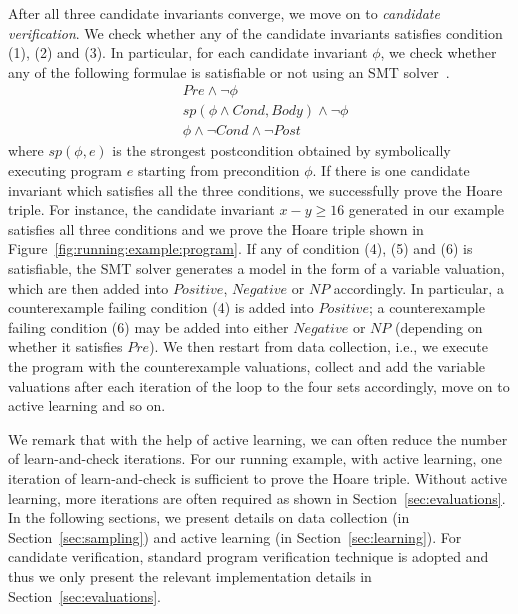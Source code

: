 After all three candidate invariants converge, we move on to \emph{candidate verification}. We check whether any of the candidate invariants satisfies condition (1), (2) and (3). In particular, for each candidate invariant $\phi$, we check whether any of the following formulae is satisfiable or not using an SMT solver~\cite{barrett2009satisfiability,de2008z3}.
\begin{align}
    & \mathit{Pre} \land \neg \phi \label{check:inv:pre} \\
     & sp(\phi \land \mathit{Cond}, \mathit{Body}) \land \neg \phi \label{check:inv:loop} \\
    & \phi \land \neg \mathit{Cond} \land \neg \mathit{Post} \label{check:inv:post}
\end{align}
where $sp(\phi,e)$ is the strongest postcondition obtained by
symbolically executing program $e$
starting from precondition $\phi$.
If there is one candidate invariant which satisfies all the three conditions, we successfully prove the Hoare triple. For instance, the candidate invariant $x - y \geq 16$ generated in our example satisfies all three conditions and we prove the Hoare triple shown in Figure~\ref{fig:running:example:program}. If any of condition (4), (5) and (6) is satisfiable, the SMT solver generates a model in the form of a variable valuation, which are then added into $Positive$, $Negative$ or $NP$ accordingly. In particular, a counterexample failing condition (4) is added into $Positive$; a counterexample failing condition (6) may be added into either $Negative$ or $NP$ (depending on whether it satisfies $Pre$). We then restart from data collection, i.e., we execute the program with the counterexample valuations, collect and add the variable valuations after each iteration of the loop to the four sets accordingly, move on to active learning and so on.

We remark that with the help of active learning, we can often reduce the number of learn-and-check iterations. For our running example, with active learning, one iteration of learn-and-check is sufficient to prove the Hoare triple. Without active learning, more iterations are often required as shown in Section~\ref{sec:evaluations}. In the following sections, we present details on data collection (in Section~\ref{sec:sampling}) and active learning (in Section~\ref{sec:learning}). For candidate verification, standard program verification technique is adopted and thus we only present the relevant implementation details in Section~\ref{sec:evaluations}.

